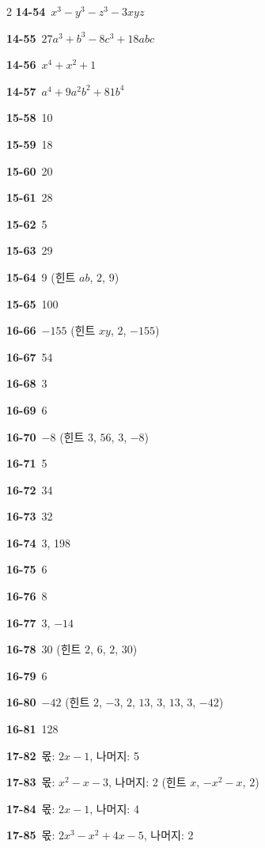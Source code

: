 \documentclass[10pt,a4paper]{article}
\begin{document}
\begin{multicols}{2}
\noindent\textbf{14-54}\ $x^3-y^3-z^3-3xyz$\par
\noindent\textbf{14-55}\ $27a^3+b^3-8c^3+18abc$\par
\noindent\textbf{14-56}\ $x^4+x^2+1$\par
\noindent\textbf{14-57}\ $a^4+9a^2b^2+81b^4$\par
\noindent\textbf{15-58}\ 10\par
\noindent\textbf{15-59}\ 18\par
\noindent\textbf{15-60}\ 20\par
\noindent\textbf{15-61}\ 28\par
\noindent\textbf{15-62}\ 5\par
\noindent\textbf{15-63}\ 29\par
\noindent\textbf{15-64}\ 9 (힌트 $ab$, $2$, $9$)\par
\noindent\textbf{15-65}\ 100\par
\noindent\textbf{16-66}\ $-155$ (힌트 $xy$, $2$, $-155$)\par
\noindent\textbf{16-67}\ 54\par
\noindent\textbf{16-68}\ 3\par
\noindent\textbf{16-69}\ 6\par
\noindent\textbf{16-70}\ $-8$ (힌트 $3$, $56$, $3$, $-8$)\par
\noindent\textbf{16-71}\ 5\par
\noindent\textbf{16-72}\ 34\par
\noindent\textbf{16-73}\ 32\par
\noindent\textbf{16-74}\ 3, 198\par
\noindent\textbf{16-75}\ 6\par
\noindent\textbf{16-76}\ 8\par
\noindent\textbf{16-77}\ 3, $-14$\par
\noindent\textbf{16-78}\ 30 (힌트 $2$, $6$, $2$, $30$)\par
\noindent\textbf{16-79}\ 6\par
\noindent\textbf{16-80}\ $-42$ (힌트 $2$, $-3$, $2$, $13$, $3$, $13$, $3$, $-42$)\par
\noindent\textbf{16-81}\ 128\par
\noindent\textbf{17-82}\ 몫: $2x-1$, 나머지: 5\par
\noindent\textbf{17-83}\ 몫: $x^2-x-3$, 나머지: 2 (힌트 $x$, $-x^2-x$, $2$)\par
\noindent\textbf{17-84}\ 몫: $2x-1$, 나머지: 4\par
\noindent\textbf{17-85}\ 몫: $2x^3-x^2+4x-5$, 나머지: 2\par

\end{multicols}
\end{document}
